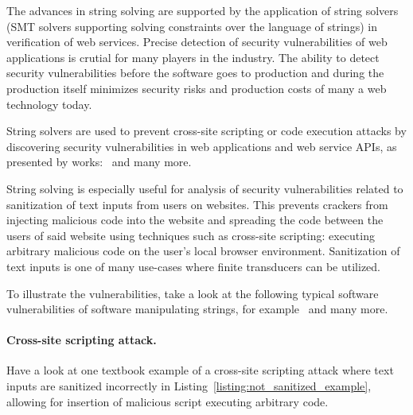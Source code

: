 The advances in string solving are supported by the application of string solvers (SMT solvers supporting solving constraints over the language of strings) in verification of web services.
Precise detection of security vulnerabilities of web applications is crutial for many players in the industry.
The ability to detect security vulnerabilities before the software goes to production and during the production itself minimizes security risks and production costs of many a web technology today.

String solvers are used to prevent cross-site scripting or code execution attacks by discovering security vulnerabilities in web applications and web service APIs, as presented by works:~\cite{String_constraints_with_concatenation_and_transducers_solved_efficiently, Composing_Static_and_Dynamic_Analysis_to_Validate_Sanitization_in_Web_Applications, Satisfiability_Modulo_Theories_Introduction_and_Applications, Simple_linear_string_constraints,Z3-str_a_z3-based_string_solver_for_web_application_analysis,S3_A_Symbolic_String_Solver_for_Vulnerability_Detection_in_Web_Applications} and many more.

String solving is especially useful for analysis of security vulnerabilities related to sanitization of text inputs from users on websites.
This prevents crackers from injecting malicious code into the website and spreading the code between the users of said website using techniques such as cross-site scripting: executing arbitrary malicious code on the user's local browser environment.
Sanitization of text inputs is one of many use-cases where finite transducers can be utilized.

To illustrate the vulnerabilities, take a look at the following typical software vulnerabilities of software manipulating strings, for example~\cite{replace_nfts_model_ModelingRegularReplacementForStringConstraintSolving_DBLP:conf/nfm/FuL10,kern14} and many more.

\paragraph{Cross-site scripting attack.}
Have a look at one textbook example of a cross-site scripting attack where text inputs are sanitized incorrectly in Listing~\ref{listing:not_sanitized_example}, allowing for insertion of malicious script executing arbitrary code.

